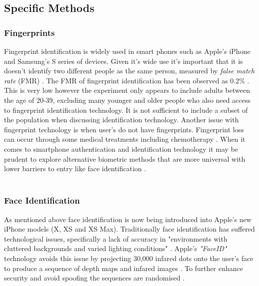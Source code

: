 \documentclass[12pt]{article}
\begin{document}
	\subsection{Specific Methods}
	\label{subsect:specific_methods}
	\subsubsection{Fingerprints}
	\label{subsubsect:fingerprints}
	Fingerprint identification is widely used in smart phones such as Apple's iPhone and Samsung's S series of devices. Given it's wide use it's important that it is doesn't identify two different people as the same person, measured by \emph{false match rate} (FMR) \citep{delac2004survey}. The FMR of fingerprint identification has been observed as $0.2\%$ \citep{delac2004survey}. This is very low however the experiment only appears to include adults between the age of 20-39, excluding many younger and older people who also need access to fingerprint identification technology. It is not sufficient to include a subset of the population when discussing identification technology. Another issue with fingerprint technology is when user's do not have fingerprints. Fingerprint loss can occur through some medical treatments including chemotherapy \citep{al2012chemotherapy}. When it comes to smartphone authentication and identification technology it may be prudent to explore alternative biometric methods that are more universal with lower barriers to entry like face identification \citep{prabhakar2003biometric}.
	\\
	\\
	\subsubsection{Face Identification}
	\label{subsubsect:face_identification}
	As mentioned above face identification is now being introduced into Apple's new iPhone models (X, XS and XS Max). Traditionally face identification has suffered technological issues, specifically a lack of accuracy in "environments with cluttered backgrounds and varied lighting conditions" \citep{prabhakar2003biometric}. Apple's \emph{"FaceID"} technology avoids this issue by projecting 30,000 infared dots onto the user's face to produce a sequence of depth maps and infared images \citep{apple_faceid_2017}. To further enhance security and avoid spoofing the sequences are randomised \citep{apple_faceid_2017}.
	\\
	\\
\end{document}
